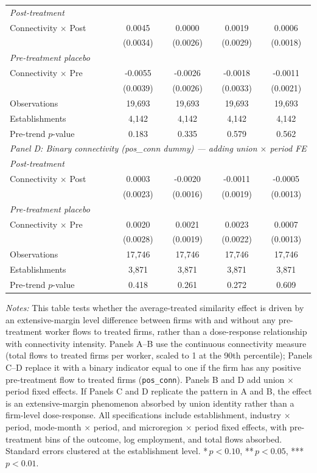 \begin{table}[H]
\begin{tabular}{lcccc}
\multicolumn{5}{l}{\textit{Post-treatment}} \\
Connectivity $\times$ Post & 0.0045 & 0.0000 & 0.0019 & 0.0006 \\
 & (0.0034) & (0.0026) & (0.0029) & (0.0018) \\
\multicolumn{5}{l}{\textit{Pre-treatment placebo}} \\
Connectivity $\times$ Pre & -0.0055 & -0.0026 & -0.0018 & -0.0011 \\
 & (0.0039) & (0.0026) & (0.0033) & (0.0021) \\
\hline
Observations &       19,693 &       19,693 &       19,693 &       19,693 \\
Establishments &        4,142 &        4,142 &        4,142 &        4,142 \\
Pre-trend $p$-value & 0.183 & 0.335 & 0.579 & 0.562 \\
\hline
\multicolumn{5}{l}{\textit{Panel D: Binary connectivity (pos\_conn dummy) — adding union $\times$ period FE}} \\
\multicolumn{5}{l}{\textit{Post-treatment}} \\
Connectivity $\times$ Post & 0.0003 & -0.0020 & -0.0011 & -0.0005 \\
 & (0.0023) & (0.0016) & (0.0019) & (0.0013) \\
\multicolumn{5}{l}{\textit{Pre-treatment placebo}} \\
Connectivity $\times$ Pre & 0.0020 & 0.0021 & 0.0023 & 0.0007 \\
 & (0.0028) & (0.0019) & (0.0022) & (0.0013) \\
\hline
Observations &       17,746 &       17,746 &       17,746 &       17,746 \\
Establishments &        3,871 &        3,871 &        3,871 &        3,871 \\
Pre-trend $p$-value & 0.418 & 0.261 & 0.272 & 0.609 \\
\hline\hline
\end{tabular}
\begin{minipage}{\linewidth}
\smallskip
\scriptsize\textit{Notes:} This table tests whether the average-treated similarity effect is driven by an extensive-margin level difference between firms with and without any pre-treatment worker flows to treated firms, rather than a dose-response relationship with connectivity intensity. Panels A--B use the continuous connectivity measure (total flows to treated firms per worker, scaled to 1 at the 90th percentile); Panels C--D replace it with a binary indicator equal to one if the firm has any positive pre-treatment flow to treated firms (\texttt{pos\_conn}). Panels B and D add union $\times$ period fixed effects. If Panels C and D replicate the pattern in A and B, the effect is an extensive-margin phenomenon absorbed by union identity rather than a firm-level dose-response. All specifications include establishment, industry $\times$ period, mode-month $\times$ period, and microregion $\times$ period fixed effects, with pre-treatment bins of the outcome, log employment, and total flows absorbed. Standard errors clustered at the establishment level. *\,$p<0.10$, **\,$p<0.05$, ***\,$p<0.01$.
\end{minipage}
\end{table}
